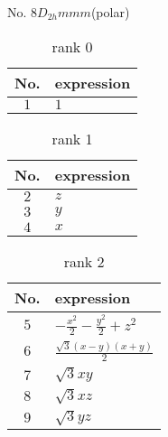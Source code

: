 \documentclass[fleqn,8pt,landscape]{jsarticle}
\begin{document}
\setcounter{MaxMatrixCols}{16}

\begin{center}
\LARGE
No. 8\quad$D_{2h}$\quad$mmm$\quad[ orthorhombic ] (polar)
\end{center}
\begin{table}[ht!]
\begin{center}
\caption{rank 0}
\renewcommand{\arraystretch}{1.3}
\begin{tabular}{cl} \hline \hline
No. & expression \\ \hline
$ 1 $ & $ 1 $ \\
 \hline \hline
\end{tabular}
\end{center}
\end{table}
\begin{table}[ht!]
\begin{center}
\caption{rank 1}
\renewcommand{\arraystretch}{1.3}
\begin{tabular}{cl} \hline \hline
No. & expression \\ \hline
$ 2 $ & $ z $ \\
$ 3 $ & $ y $ \\
$ 4 $ & $ x $ \\
 \hline \hline
\end{tabular}
\end{center}
\end{table}
\begin{table}[ht!]
\begin{center}
\caption{rank 2}
\renewcommand{\arraystretch}{1.3}
\begin{tabular}{cl} \hline \hline
No. & expression \\ \hline
$ 5 $ & $ - \frac{x^{2}}{2} - \frac{y^{2}}{2} + z^{2} $ \\
$ 6 $ & $ \frac{\sqrt{3} \left(x - y\right) \left(x + y\right)}{2} $ \\
$ 7 $ & $ \sqrt{3} x y $ \\
$ 8 $ & $ \sqrt{3} x z $ \\
$ 9 $ & $ \sqrt{3} y z $ \\
 \hline \hline
\end{tabular}
\end{center}
\end{table}
\end{document}
